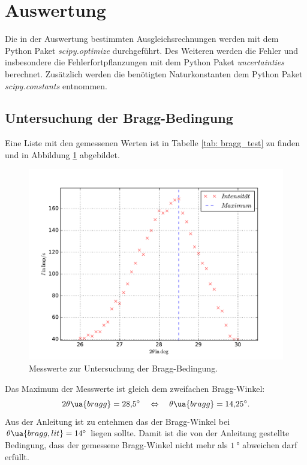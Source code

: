 \section{Auswertung}
Die in der Auswertung bestimmten Ausgleichsrechnungen werden mit
dem Python Paket \emph{scipy.optimize}\cite{scipy} durchgeführt.
Des Weiteren werden die Fehler und insbesondere die Fehlerfortpflanzungen
mit dem Python Paket \emph{uncertainties}\cite{uncertainties} berechnet.
Zusätzlich werden die benötigten Naturkonstanten dem Python Paket \emph{scipy.constants}\cite{scipy}
entnommen.
\FloatBarrier
\subsection{Untersuchung der Bragg-Bedingung}
Eine Liste mit den gemessenen Werten ist in Tabelle \ref{tab: bragg_test} zu finden und in Abbildung \ref{fig: bragg_plot} abgebildet.

\begin{figure}
  \centering
  \includegraphics[width=0.8 \textwidth]{../Messdaten/bragbed.pdf}
  \caption{Messwerte zur Untersuchung der Bragg-Bedingung.}
  \label{fig: bragg_plot}
\end{figure}
Das Maximum der Messwerte ist gleich dem zweifachen Bragg-Winkel:
\begin{equation}
  \label{eq:bestimmt_bragg_winkel}
  2\theta\ua{bragg}=\SI{28.5}{\degree} \quad \Leftrightarrow \quad \theta\ua{bragg}=\SI{14.25}{\degree}.
\end{equation} %
Aus der Anleitung \cite{} ist zu entehmen das der Bragg-Winkel bei $\theta\ua{bragg,lit}=\SI{14}{\degree}$ liegen sollte.
Damit ist die von der Anleitung gestellte Bedingung, dass der gemessene Bragg-Winkel nicht mehr
als $\SI{1}{\degree}$ abweichen darf erfüllt.
\FloatBarrier

